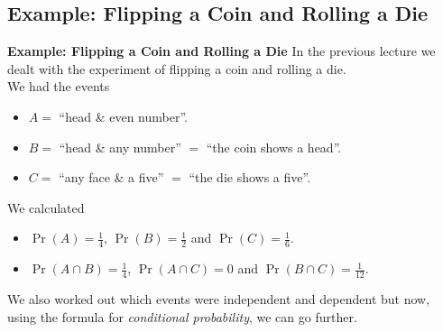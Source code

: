 \documentclass[compress]{beamer}        %
\makeatletter
\newcommand{\tcb}{\textcolor{beamer@blendedblue}}
\makeatother
\begin{document}
\subsection{Example: Flipping a Coin and Rolling a Die}
\begin{frame}{\bf \tcb{Example: Flipping a Coin and Rolling a Die}}
In the previous lecture we dealt with the experiment of flipping a coin and rolling a die.\\[0.3cm]
We had the events\\[0.0cm]
\begin{itemize}\itemsep0.2cm
\item $A =$ ``head \& even number''.
\item $B =$ ``head \& any number'' $=$ ``the coin shows a head''.
\item $C =$ ``any face \& a five'' $=$ ``the die shows a five''.\\[0.3cm]
\end{itemize}

We calculated\\[0.0cm]
\begin{itemize}\itemsep0.2cm
\item $\Pr(A) = \tfrac{1}{4}$, $\Pr(B) = \tfrac{1}{2}$ and $\Pr(C) = \tfrac{1}{6}$.
\item $\Pr(A \cap B) = \tfrac{1}{4}$, $\Pr(A \cap C) = 0$ and $\Pr(B \cap C) = \tfrac{1}{12}$.\\[0.3cm]
\end{itemize}

We also worked out which events were independent and dependent but now, using the formula for \emph{conditional probability}, we can go further.

\end{frame}
\end{document}
